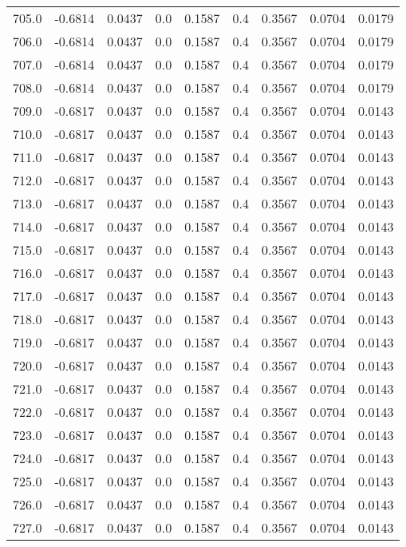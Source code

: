 \begin{longtable}{lrrrrrrrr}
705.0 & -0.6814 & 0.0437 & 0.0 & 0.1587 & 0.4 & 0.3567 & 0.0704 & 0.0179 \\
706.0 & -0.6814 & 0.0437 & 0.0 & 0.1587 & 0.4 & 0.3567 & 0.0704 & 0.0179 \\
707.0 & -0.6814 & 0.0437 & 0.0 & 0.1587 & 0.4 & 0.3567 & 0.0704 & 0.0179 \\
708.0 & -0.6814 & 0.0437 & 0.0 & 0.1587 & 0.4 & 0.3567 & 0.0704 & 0.0179 \\
709.0 & -0.6817 & 0.0437 & 0.0 & 0.1587 & 0.4 & 0.3567 & 0.0704 & 0.0143 \\
710.0 & -0.6817 & 0.0437 & 0.0 & 0.1587 & 0.4 & 0.3567 & 0.0704 & 0.0143 \\
711.0 & -0.6817 & 0.0437 & 0.0 & 0.1587 & 0.4 & 0.3567 & 0.0704 & 0.0143 \\
712.0 & -0.6817 & 0.0437 & 0.0 & 0.1587 & 0.4 & 0.3567 & 0.0704 & 0.0143 \\
713.0 & -0.6817 & 0.0437 & 0.0 & 0.1587 & 0.4 & 0.3567 & 0.0704 & 0.0143 \\
714.0 & -0.6817 & 0.0437 & 0.0 & 0.1587 & 0.4 & 0.3567 & 0.0704 & 0.0143 \\
715.0 & -0.6817 & 0.0437 & 0.0 & 0.1587 & 0.4 & 0.3567 & 0.0704 & 0.0143 \\
716.0 & -0.6817 & 0.0437 & 0.0 & 0.1587 & 0.4 & 0.3567 & 0.0704 & 0.0143 \\
717.0 & -0.6817 & 0.0437 & 0.0 & 0.1587 & 0.4 & 0.3567 & 0.0704 & 0.0143 \\
718.0 & -0.6817 & 0.0437 & 0.0 & 0.1587 & 0.4 & 0.3567 & 0.0704 & 0.0143 \\
719.0 & -0.6817 & 0.0437 & 0.0 & 0.1587 & 0.4 & 0.3567 & 0.0704 & 0.0143 \\
720.0 & -0.6817 & 0.0437 & 0.0 & 0.1587 & 0.4 & 0.3567 & 0.0704 & 0.0143 \\
721.0 & -0.6817 & 0.0437 & 0.0 & 0.1587 & 0.4 & 0.3567 & 0.0704 & 0.0143 \\
722.0 & -0.6817 & 0.0437 & 0.0 & 0.1587 & 0.4 & 0.3567 & 0.0704 & 0.0143 \\
723.0 & -0.6817 & 0.0437 & 0.0 & 0.1587 & 0.4 & 0.3567 & 0.0704 & 0.0143 \\
724.0 & -0.6817 & 0.0437 & 0.0 & 0.1587 & 0.4 & 0.3567 & 0.0704 & 0.0143 \\
725.0 & -0.6817 & 0.0437 & 0.0 & 0.1587 & 0.4 & 0.3567 & 0.0704 & 0.0143 \\
726.0 & -0.6817 & 0.0437 & 0.0 & 0.1587 & 0.4 & 0.3567 & 0.0704 & 0.0143 \\
727.0 & -0.6817 & 0.0437 & 0.0 & 0.1587 & 0.4 & 0.3567 & 0.0704 & 0.0143 \\

\end{longtable}
